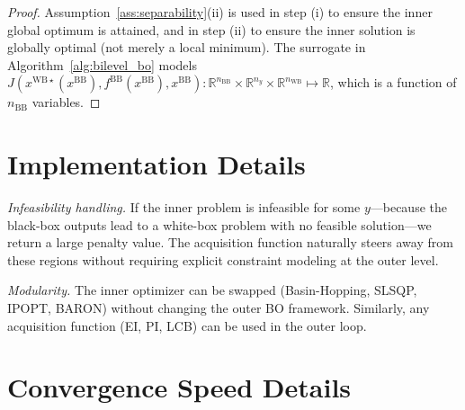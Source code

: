\documentclass[12pt,a4paper]{article}%
\theoremstyle{plain}%
\theoremstyle{remark}%
\theoremstyle{definition}%
\def\WB{\mathrm{WB}}
\def\BB{\mathrm{BB}}
\begin{document}
\begin{appendices}
\begin{proof}
Assumption~\ref{ass:separability}(ii) is used in step (i) to ensure the inner global optimum is attained, and in step (ii) to ensure the inner solution is globally optimal (not merely a local minimum). The surrogate in Algorithm~\ref{alg:bilevel_bo} models $J(x^{\WB\star}(x^{\BB}), f^{\BB}(x^{\BB}), x^{\BB}):\mathbb{R}^{n_\BB} \times \mathbb{R}^{n_y} \times \mathbb{R}^{n_\WB} \mapsto \mathbb{R}$, which is a function of $n_{\BB}$ variables.
\end{proof}

\section{Implementation Details}\label{sec:implementation_details}

\emph{Infeasibility handling.} If the inner problem is infeasible for some $y$---because the black-box outputs lead to a white-box problem with no feasible solution---we return a large penalty value. The acquisition function naturally steers away from these regions without requiring explicit constraint modeling at the outer level.

\emph{Modularity.} The inner optimizer can be swapped (Basin-Hopping, SLSQP, IPOPT, BARON) without changing the outer BO framework. Similarly, any acquisition function (EI, PI, LCB) can be used in the outer loop.

\section{Convergence Speed Details}\label{sec:convergence_speed_details}


\end{appendices}
\end{document}
